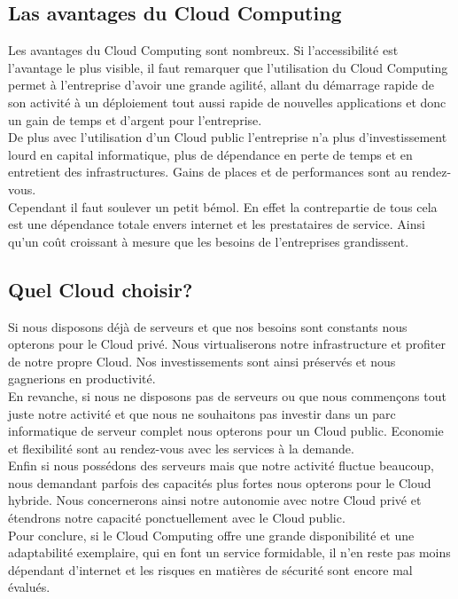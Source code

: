 \documentclass{report}
\begin{document}
    \subsection{Las avantages du Cloud Computing}
    Les avantages du Cloud Computing sont nombreux. Si l’accessibilité est l’avantage le plus visible, il faut remarquer que l’utilisation du Cloud Computing permet à l’entreprise d’avoir une grande agilité, allant du démarrage rapide de son activité à un déploiement tout aussi rapide de nouvelles applications et donc un gain de temps et d’argent pour l’entreprise.\\

    De plus avec l’utilisation d’un Cloud public l’entreprise n’a plus d’investissement lourd en capital informatique, plus de dépendance en perte de temps et en entretient des infrastructures. Gains de places et de performances sont au rendez-vous.\\

    Cependant il faut soulever un petit bémol. En effet la contrepartie de tous cela est une dépendance totale envers internet et les prestataires de service. Ainsi qu’un coût croissant à mesure que les besoins de l’entreprises grandissent.

    \subsection{Quel Cloud choisir?}
    Si nous disposons déjà de serveurs et que nos besoins sont constants nous opterons pour le Cloud privé. Nous virtualiserons notre infrastructure et profiter de notre propre Cloud. Nos investissements sont ainsi préservés et nous gagnerions en productivité.\\

    En revanche, si nous ne disposons pas de serveurs ou que nous commençons tout juste notre activité et que nous ne souhaitons pas investir dans un parc informatique de serveur complet nous opterons pour un Cloud public. Economie et flexibilité sont au rendez-vous avec les services à la demande.\\

    Enfin si nous possédons des serveurs mais que notre activité fluctue beaucoup, nous demandant parfois des capacités plus fortes nous opterons pour le Cloud hybride. Nous concernerons ainsi notre autonomie avec notre Cloud privé et étendrons notre capacité ponctuellement avec le Cloud public.\\

    Pour conclure, si le Cloud Computing offre une grande disponibilité et une adaptabilité exemplaire, qui en font un service formidable, il n’en reste pas moins dépendant d’internet et les risques en matières de sécurité sont encore mal évalués.
\end{document}
